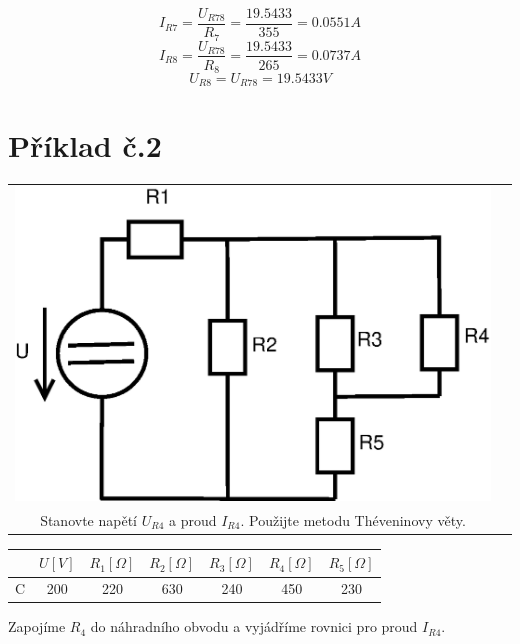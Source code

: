 \documentclass[a4paper, 12pt]{article}
\begin{document}
\vspace{1mm}
$$ I_{R7} = \frac{U_{R78}}{R_7} = \frac{19.5433}{355} = 0.0551 A $$
\vspace{1mm}
$$ I_{R8} = \frac{U_{R78}}{R_8} = \frac{19.5433}{265} = 0.0737 A $$
\vspace{1mm}
$$ U_{R8} = U_{R78} = 19.5433 V $$

\newpage
\section{Příklad č.2}

\begin{tabular}{c c}
    \includegraphics[scale=0.5]{pr2/bb_1.eps}
    &
    \begin{minipage}{7cm}
        .\\[-5cm]
        Stanovte napětí $U_{R4}$ a proud $I_{R4}$. Použijte metodu Théveninovy věty.
    \end{minipage}
\end{tabular}

\begin{tabular}{|c|c|c|c|c|c|c|}
    \hline
    & $U [V]$ & $R_1 [\Omega]$ & $R_2 [\Omega]$ & $R_3 [\Omega]$ & $R_4 [\Omega]$ & $R_5 [\Omega]$
    \\ \hline
    C & 200 & 220 & 630 & 240 & 450 & 230
    \\ \hline
\end{tabular}
\vspace{1mm}

Zapojíme $R_4$ do náhradního obvodu a vyjádříme rovnici pro proud $I_{R4}$.
\end{document}
